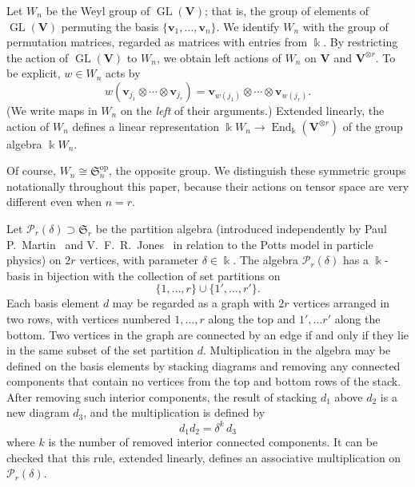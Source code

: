 \documentclass[10pt]{article}
\theoremstyle{definition}
\DeclareMathOperator{\GL}{GL}
\DeclareMathOperator{\End}{End}
\DeclareMathOperator{\op}{op}
\newcommand{\Sym}{\mathfrak{S}}
\newcommand{\Ptn}{\mathcal{P}}
\newcommand{\V}{\mathbf{V}} %
\newcommand{\bv}{\mathbf{v}} %
\begin{document}
Let $W_n$ be the Weyl group of $\GL(\V)$; that is, the group of elements
of $\GL(\V)$ permuting the basis $\{\bv_1, \dots, \bv_n\}$. We identify
$W_n$ with the group of permutation matrices, regarded as matrices
with entries from $\Bbbk$. By restricting the action of $\GL(\V)$ to
$W_n$, we obtain left actions of $W_n$ on $\V$ and $\V^{\otimes
 r}$. To be explicit, $w \in W_n$ acts by
\begin{equation}\label{eq:W_n-action}
 w (\bv_{j_1} \otimes \cdots \otimes \bv_{j_r}) = \bv_{w(j_1)} \otimes
 \cdots \otimes \bv_{w(j_r)}.
\end{equation}
(We write maps in $W_n$ on the \emph{left} of their arguments.)
Extended linearly, the action of $W_n$ defines a linear representation
$\Bbbk W_n \to \End_\Bbbk( \V^{\otimes r} )$ of the group algebra
$\Bbbk W_n$.

Of course, $W_n \cong \Sym_n^{\op}$, the opposite group. We distinguish
these symmetric groups notationally throughout this paper, because
their actions on tensor space are very different even when $n=r$.

Let $\Ptn_r(\delta) \supset \Sym_r$ be the partition algebra
(introduced independently by Paul P.~Martin~\cite{Marbook,
 Martin:1994} and V.~F.~R.~Jones~\cite{Jones} in relation to the Potts
model in particle physics) on $2r$ vertices, with parameter $\delta
\in \Bbbk$. The algebra $\Ptn_r(\delta)$ has a $\Bbbk$-basis in
bijection with the collection of set partitions on
\[ \{1, \dots, r\} \cup \{1', \dots, r'\}. \]
Each basis element $d$ may be regarded as a graph with $2r$ vertices
arranged in two rows, with vertices numbered $1, \dots, r$ along the
top and $1', \dots r'$ along the bottom. Two vertices in the graph are
connected by an edge if and only if they lie in the same subset of the
set partition $d$. Multiplication in the algebra may be defined on the
basis elements by stacking diagrams and removing any connected
components that contain no vertices from the top and bottom rows of
the stack. After removing such interior components, the result of
stacking $d_1$ above $d_2$ is a new diagram $d_3$, and the
multiplication is defined by
\begin{equation}\label{eq:Ptn-alg-mult}
 d_1 d_2 = \delta^k \, d_3
\end{equation}
where $k$ is the number of removed interior connected components. It
can be checked that this rule, extended linearly, defines an
associative multiplication on $\Ptn_r(\delta)$. 
\end{document}
